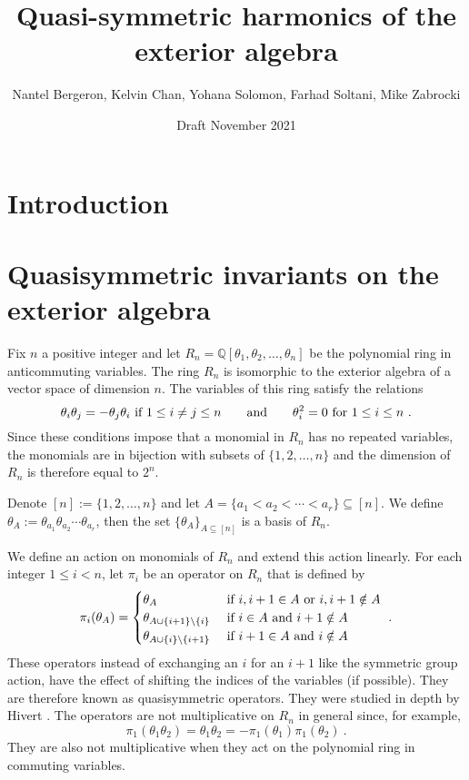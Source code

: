 \documentclass[11pt]{amsart}
\title{Quasi-symmetric harmonics of the exterior algebra}
\author{Nantel Bergeron,
Kelvin Chan,
Yohana Solomon,
Farhad Soltani,
Mike Zabrocki}
\date{Draft November 2021}
\theoremstyle{definition}
\numberwithin{equation}{section}
\begin{document}
\maketitle

\section{Introduction}


\section{Quasisymmetric invariants on the exterior algebra}

Fix $n$ a positive integer and
let $R_n = {\mathbb Q}[\theta_1, \theta_2, \ldots, \theta_n]$ be the
polynomial ring in anticommuting variables.
The ring $R_n$ is isomorphic to the exterior algebra of a vector
space of dimension $n$.  The variables of this ring satisfy the relations
\[
\theta_i \theta_j = - \theta_j \theta_i \hbox{ if } 1 \leq i \neq j \leq n
\qquad\hbox{and}\qquad \theta_i^2 = 0 \hbox{ for }1 \leq i \leq n~.
\]
Since these conditions impose that a monomial in $R_n$ has no repeated variables,
the monomials are in bijection with subsets of $\{1,2,\ldots, n\}$
and the dimension of $R_n$ is therefore equal to $2^n$.

Denote $[n] := \{1,2, \ldots,n\}$ and
let $A = \{a_1 < a_2 < \cdots < a_r \} \subseteq [n]$.
We define $\theta_A := \theta_{a_1} \theta_{a_2} \cdots \theta_{a_r}$,
then the set $\{ \theta_A \}_{A \subseteq [n]}$ is a basis of $R_n$.

We define an action on monomials of $R_n$ and extend this action linearly.
For each integer $1 \leq i < n$, let $\pi_i$ be an operator on $R_n$
that is defined by
\begin{equation}\label{eq:pi}
\pi_i(\theta_A) = \begin{cases}
\theta_{A} & \hbox{ if } i, i+1 \in A\hbox{ or }i, i+1 \notin A\\
\theta_{A \cup \{i+1\} \backslash \{i\}} & \hbox{ if } i\in A\hbox{ and }i+1 \notin A\\
\theta_{A \cup \{i\} \backslash \{i+1\}} & \hbox{ if } i+1\in A\hbox{ and }i \notin A
\end{cases}~.
\end{equation}
These operators instead of exchanging an $i$ for an $i+1$ like the symmetric group
action, have the effect of shifting the indices of the variables (if possible).  They
are therefore known as quasisymmetric operators.  They were studied in depth by
Hivert \cite{H}.  The operators are not multiplicative on $R_n$ in general since, for example,
\[
\pi_1( \theta_{1} \theta_{2})
= \theta_1 \theta_2
= - \pi_1( \theta_{1}) \pi_1(\theta_{2})~.
\]
They are also not multiplicative when they act on the polynomial ring
in commuting variables.
\end{document}
